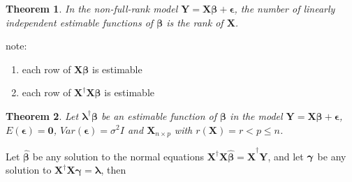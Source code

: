 \documentclass{article}
\newtheorem{theorem}{Theorem}
\begin{document}
\bigskip

\begin{theorem}
In the non-full-rank model $\mathbf{Y=X\beta +\epsilon }$, the number of
linearly independent estimable functions of $\mathbf{\beta }$ is the rank of 
$\mathbf{X}$.
\end{theorem}

\bigskip

note:

\begin{enumerate}
\item each row of $\mathbf{X\beta }$ is estimable

\item each row of $\mathbf{X}^{\dagger }\mathbf{X\beta }$ is estimable
\end{enumerate}

\bigskip

\begin{theorem}
Let $\mathbf{\lambda }^{\dagger }\mathbf{\beta }$ be an estimable function
of $\mathbf{\beta }$ in the model $\mathbf{Y=X\beta +\epsilon }$, $E\left( 
\mathbf{\epsilon }\right) =\mathbf{0}$, $Var\left( \mathbf{\epsilon }\right)
=\sigma ^{2}I$ and $\mathbf{X}_{n\times p}$ with $r\left( \mathbf{X}\right)
=r<p\leq n$.
\end{theorem}

\bigskip

Let $\mathbf{\hat{\beta}}$ be any solution to the normal equations $\mathbf{X%
}^{\dagger }\mathbf{X\hat{\beta}=X}^{\dagger }\mathbf{Y}$, and let $\mathbf{%
\gamma }$ be any solution to $\mathbf{X}^{\dagger }\mathbf{X\gamma =\lambda }
$, then
\end{document}
